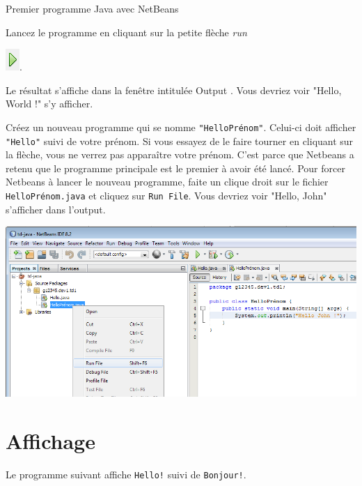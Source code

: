\documentclass[a4paper,11pt]{article}
\begin{document}
\begin{Tutoriel}{Premier programme Java avec NetBeans}
\begin{steps}
		\item Lancez le programme en cliquant sur la petite flèche \emph{run} 
			
			\includegraphics{images/nb_newproject_run}.
			
			Le résultat s'affiche dans la fenêtre intitulée \og Output \fg.
			Vous devriez voir "Hello, World !" s'y afficher.

		\item Créez un nouveau programme qui se nomme \texttt{"HelloPrénom"}. Celui-ci doit afficher \texttt{"Hello"} suivi de votre prénom.
		Si vous essayez de le faire tourner en cliquant sur la flèche, vous ne verrez pas apparaître votre prénom. C'est parce que Netbeans a retenu que le programme principale est le premier à avoir été lancé. Pour forcer Netbeans à lancer le nouveau programme, faite un clique droit sur le fichier \texttt{HelloPrénom.java} et cliquez sur \texttt{Run File}. Vous devriez voir "Hello, John" s'afficher dans l'output.

			\includegraphics{images/nb_newproject_run_othermain}

	\end{steps}

	\end{Tutoriel}

\section{Affichage}

	Le programme suivant affiche \texttt{Hello!} suivi de \texttt{Bonjour!}.
\end{document}
